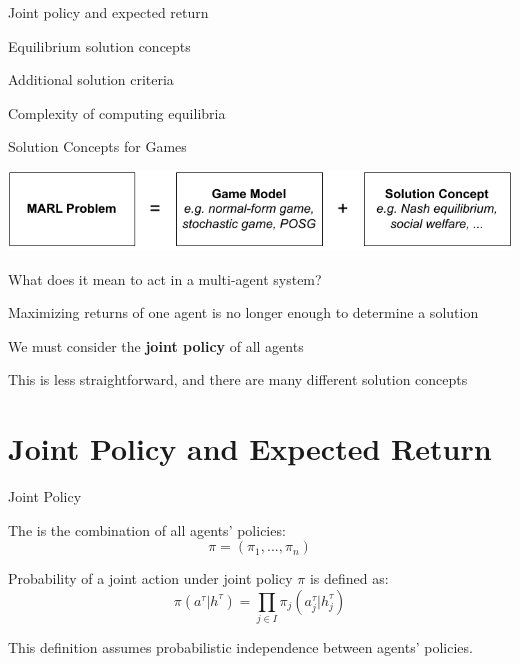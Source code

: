 

\leoslide

\subtitle{Solution Concepts for Games}


\maketitle

\introslide

\begin{frame}{\outline}

\blist
    \item Joint policy and expected return
    \item Equilibrium solution concepts
    \item Additional solution criteria 
    \item Complexity of computing equilibria
\elist
    
\end{frame}

\begin{frame}{Solution Concepts for Games}
	\begin{center}
        \includegraphics{images/chapter_4/marl-learning-problem.pdf}
   	\end{center}
    	
    What does it mean to act  in a multi-agent system?

    \blist
        \item Maximizing returns of one agent is no longer enough to determine a solution
        \item We must consider the {\bf joint policy} of all agents
        \item This is less straightforward, and there are many different solution concepts
    \elist
    
\end{frame}

\section{Joint Policy and Expected Return}

\begin{frame}[t]{Joint Policy}

    The  is the combination of all agents' policies:
    $$\pi = (\pi_1, ..., \pi_n)$$

    Probability of a joint action under joint policy $\pi$ is defined as:
    $$\pi(a^{\tau}|h^{\tau}) = \prod_{j \in I}\pi_{j}(a_{j}^\tau | h^{\tau}_j)$$

    \begin{notebox}
        This definition assumes probabilistic independence between agents' policies. 
    \end{notebox}

\end{frame}

